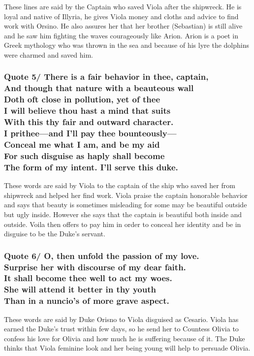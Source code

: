 \documentclass[12pt, a4paper]{article}
\begin{document}
These lines are said by the Captain who saved Viola after the shipwreck.
He is loyal and native of Illyria, he gives Viola money and cloths and
advice to find work with Orsino. He also assures her that her brother 
(Sebastian) is still alive and he saw 
him fighting the waves courageously like Arion. Arion is a poet in Greek
mythology who was thrown in the sea and because of his lyre the dolphins
were charmed and saved him.

\subsubsection*{Quote 5/
There is a fair behavior in thee, captain,\\
And though that nature with a beauteous wall\\
Doth oft close in pollution, yet of thee\\
I will believe thou hast a mind that suits\\
With this thy fair and outward character.\\
I prithee—and I’ll pay thee bounteously—\\
Conceal me what I am, and be my aid\\
For such disguise as haply shall become\\
The form of my intent. I’ll serve this duke.
}

These words are said by Viola to the captain of the ship who saved her
from shipwreck and helped her find work. Viola praise the captain 
honorable behavior and says that beauty is 
sometimes misleading for some may be beautiful outside but ugly inside.
However she says that the captain is beautiful both inside and outside.
Voila then offers to pay him in order to conceal her identity and be in
disguise to be the Duke's servant.

\subsubsection*{Quote 6/
O, then unfold the passion of my love.\\
Surprise her with discourse of my dear faith.\\
It shall become thee well to act my woes.\\
She will attend it better in thy youth\\
Than in a nuncio’s of more grave aspect.
}

These words are said by Duke Orisno to Viola disguised as Cesario.
Viola has earned the Duke's trust within few days, so he send her to 
Countess Olivia to confess his love for Olivia and how much he is 
suffering because of it. The Duke thinks that Viola feminine look and 
her being young will help to persuade Olivia.
\end{document}

